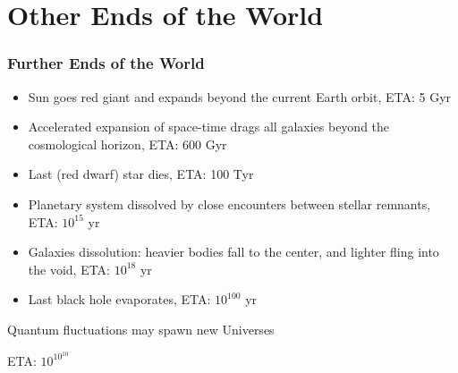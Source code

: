 \documentclass{beamer}
\begin{document}
\section{Other Ends of the World}
\begin{frame}
\frametitle{Further Ends of the World}
\begin{itemize}
\item Sun goes red giant and expands beyond the current Earth orbit, ETA: 5 Gyr
\item Accelerated expansion of space-time drags all galaxies beyond the cosmological horizon, ETA: 600 Gyr
\item Last (red dwarf) star dies, ETA: 100 Tyr
\item Planetary system dissolved by close encounters between stellar remnants, ETA: $10^{15}$ yr
\item Galaxies dissolution: heavier bodies fall to the center, and lighter fling into the void, ETA: $10^{18}$ yr
\item Last black hole evaporates, ETA: $10^{100}$ yr
\end{itemize}
\end{frame}

\begin{frame}
\Large{\centerline{Quantum fluctuations may spawn new Universes}}
\Large{\centerline{ETA: $10^{10^{10^{\ldots}}}$}}
\end{frame}
\end{document}
